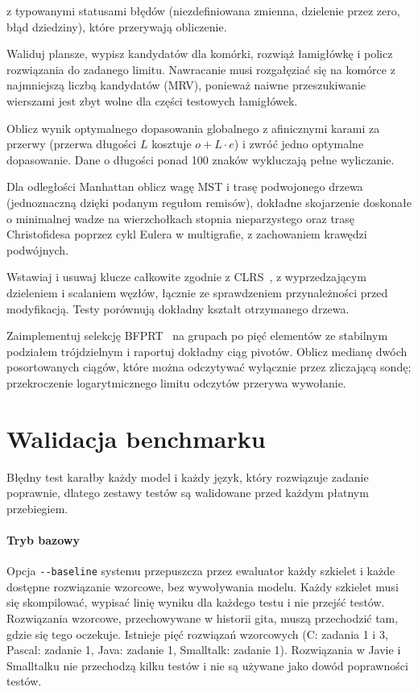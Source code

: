 \begin{description}[leftmargin=0pt,itemsep=3pt,font=\normalfont\bfseries]
    z typowanymi statusami błędów (niezdefiniowana zmienna, dzielenie przez zero, błąd dziedziny),
    które przerywają obliczenie.
  \item[Zadanie 6: Sudoku.] Waliduj plansze, wypisz kandydatów dla komórki, rozwiąż łamigłówkę
    i policz rozwiązania do zadanego limitu. Nawracanie musi rozgałęziać się na komórce z najmniejszą
    liczbą kandydatów (MRV), ponieważ naiwne przeszukiwanie wierszami jest zbyt wolne dla części
    testowych łamigłówek.
  \item[Zadanie 7: dopasowanie sekwencji.] Oblicz wynik optymalnego dopasowania globalnego
    z afinicznymi karami za przerwy (przerwa długości $L$ kosztuje $o + L\cdot e$) i zwróć jedno
    optymalne dopasowanie. Dane o długości ponad 100 znaków wykluczają pełne wyliczanie.
  \item[Zadanie 8: metryczny TSP.] Dla odległości Manhattan oblicz wagę MST i trasę podwojonego
    drzewa (jednoznaczną dzięki podanym regułom remisów), dokładne skojarzenie doskonałe o minimalnej
    wadze na wierzchołkach stopnia nieparzystego oraz trasę Christofidesa poprzez cykl Eulera
    w multigrafie, z zachowaniem krawędzi podwójnych.
  \item[Zadanie 9: B-drzewo.] Wstawiaj i usuwaj klucze całkowite zgodnie z CLRS~\cite{cormen2009clrs},
    z wyprzedzającym dzieleniem i scalaniem węzłów, łącznie ze sprawdzeniem przynależności przed
    modyfikacją. Testy porównują dokładny kształt otrzymanego drzewa.
  \item[Zadanie 10: statystyki pozycyjne.] Zaimplementuj selekcję BFPRT~\cite{blum1973time} na
    grupach po pięć elementów ze stabilnym podziałem trójdzielnym i raportuj dokładny ciąg pivotów.
    Oblicz medianę dwóch posortowanych ciągów, które można odczytywać wyłącznie przez zliczającą
    sondę; przekroczenie logarytmicznego limitu odczytów przerywa wywołanie.
\end{description}

\section{Walidacja benchmarku}
\label{sec:benchmark-validation}

Błędny test karałby każdy model i każdy język, który rozwiązuje zadanie poprawnie, dlatego zestawy
testów są walidowane przed każdym płatnym przebiegiem.

\paragraph{Tryb bazowy} Opcja \texttt{-{}-baseline} systemu przepuszcza przez ewaluator każdy szkielet
i każde dostępne rozwiązanie wzorcowe, bez wywoływania modelu. Każdy szkielet musi się
skompilować, wypisać linię wyniku dla każdego testu i nie przejść testów. Rozwiązania wzorcowe,
przechowywane w historii gita, muszą przechodzić tam, gdzie się tego oczekuje. Istnieje pięć
rozwiązań wzorcowych (C: zadania 1 i 3, Pascal: zadanie 1, Java: zadanie 1, Smalltalk: zadanie 1).
Rozwiązania w Javie i Smalltalku nie przechodzą kilku testów i nie są używane jako dowód
poprawności testów.

